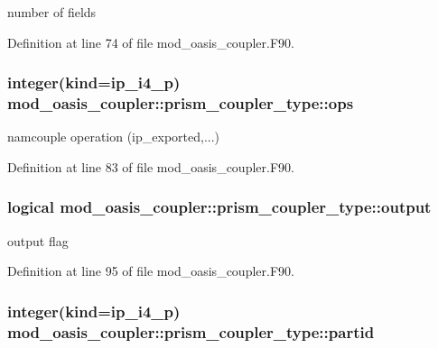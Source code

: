 number of fields 



Definition at line 74 of file mod\+\_\+oasis\+\_\+coupler.\+F90.

\hypertarget{structmod__oasis__coupler_1_1prism__coupler__type_ac041ba5de191fa34468f61a674dd5bac}{
\subsubsection[{ops}]{\setlength{\rightskip}{0pt plus 5cm}integer(kind=ip\+\_\+i4\+\_\+p) mod\+\_\+oasis\+\_\+coupler\+::prism\+\_\+coupler\+\_\+type\+::ops\hspace{0.3cm}{\ttfamily [private]}}}\label{structmod__oasis__coupler_1_1prism__coupler__type_ac041ba5de191fa34468f61a674dd5bac}


namcouple operation (ip\+\_\+exported,...) 



Definition at line 83 of file mod\+\_\+oasis\+\_\+coupler.\+F90.

\hypertarget{structmod__oasis__coupler_1_1prism__coupler__type_a56fc19e4619dd8224859f222566ea7ca}{
\subsubsection[{output}]{\setlength{\rightskip}{0pt plus 5cm}logical mod\+\_\+oasis\+\_\+coupler\+::prism\+\_\+coupler\+\_\+type\+::output\hspace{0.3cm}{\ttfamily [private]}}}\label{structmod__oasis__coupler_1_1prism__coupler__type_a56fc19e4619dd8224859f222566ea7ca}


output flag 



Definition at line 95 of file mod\+\_\+oasis\+\_\+coupler.\+F90.

\hypertarget{structmod__oasis__coupler_1_1prism__coupler__type_a5506dc46a0c8def7417a6e2a9c046474}{
\subsubsection[{partid}]{\setlength{\rightskip}{0pt plus 5cm}integer(kind=ip\+\_\+i4\+\_\+p) mod\+\_\+oasis\+\_\+coupler\+::prism\+\_\+coupler\+\_\+type\+::partid\hspace{0.3cm}{\ttfamily [private]}}}\label{structmod__oasis__coupler_1_1prism__coupler__type_a5506dc46a0c8def7417a6e2a9c046474}


